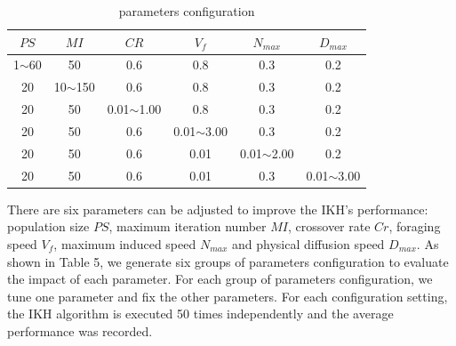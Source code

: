 \documentclass[10pt,journal,compsoc]{IEEEtran}
\begin{document}
\begin{table}[!t]
\renewcommand{\arraystretch}{1.3}
\caption{parameters configuration}
\label{table_example}
\centering
\begin{tabular}{cccccc}
\hline
\bfseries $PS$ & \bfseries $MI$ & \bfseries $CR$ & \bfseries $V_f$ & \bfseries $N_{max}$ & \bfseries $D_{max}$ \\
\hline
1$\sim$60 & 50          & 0.6            & 0.8            &  0.3            &  0.2 \\
20        & 10$\sim$150 & 0.6            & 0.8            &  0.3            &  0.2 \\
20        & 50          & 0.01$\sim$1.00 & 0.8            &  0.3            &  0.2 \\
20        & 50          & 0.6            & 0.01$\sim$3.00 &  0.3            &  0.2 \\
20        & 50          & 0.6            & 0.01           &  0.01$\sim$2.00 &  0.2 \\
20        & 50          & 0.6            & 0.01           &  0.3            &  0.01$\sim$3.00 \\
\hline
\end{tabular}
\end{table}

There are six parameters can be adjusted to improve the IKH's performance: population size $PS$, maximum iteration number $MI$, crossover rate $Cr$, foraging speed $V_f$, maximum induced speed $N_{max}$ and physical diffusion speed $D_{max}$. As shown in Table 5, we generate six groups of parameters configuration to evaluate the impact of each parameter. For each group of parameters configuration, we tune one parameter and fix the other parameters. For each configuration setting, the IKH algorithm is executed 50 times independently and the average performance was recorded.
\end{document}
